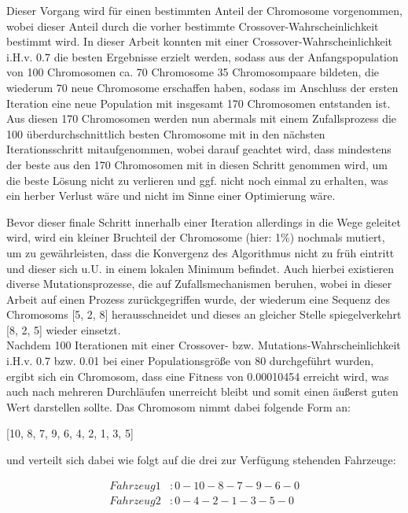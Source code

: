 \documentclass[a4paper,12pt,parskip,bibtotoc,liststotoc]{article}
\begin{document}
Dieser Vorgang wird für einen bestimmten Anteil der Chromosome vorgenommen, wobei dieser Anteil durch die vorher bestimmte Crossover-Wahrscheinlichkeit bestimmt wird. 
In dieser Arbeit konnten mit einer Crossover-Wahrscheinlichkeit i.H.v. 0.7 die besten Ergebnisse erzielt werden, sodass aus der Anfangspopulation von 100 Chromosomen ca. 70 Chromosome 35 Chromosompaare bildeten, die wiederum 70 neue Chromosome erschaffen haben, sodass im Anschluss der ersten Iteration eine neue Population mit insgesamt 170 Chromosomen entstanden ist. 
Aus diesen 170 Chromosomen werden nun abermals mit einem Zufallsprozess die 100 überdurchschnittlich besten Chromosome mit in den nächsten Iterationsschritt mitaufgenommen, wobei darauf geachtet wird, dass mindestens der beste aus den 170 Chromosomen mit in diesen Schritt genommen wird, um die beste Lösung nicht zu verlieren und ggf. nicht noch einmal zu erhalten, was ein herber Verlust wäre und nicht im Sinne einer Optimierung wäre.

Bevor dieser finale Schritt innerhalb einer Iteration allerdings in die Wege geleitet wird, wird ein kleiner Bruchteil der Chromosome (hier: 1\%) nochmals mutiert, um zu gewährleisten, dass die Konvergenz des Algorithmus nicht zu früh eintritt und dieser sich u.U. in einem lokalen Minimum befindet. 
Auch hierbei existieren diverse Mutationsprozesse, die auf Zufallsmechanismen beruhen, wobei in dieser Arbeit auf einen Prozess zurückgegriffen wurde, der wiederum eine Sequenz des Chromosoms [5, 2, 8] herausschneidet und dieses an gleicher Stelle spiegelverkehrt [8, 2, 5] wieder einsetzt.\\

Nachdem 100 Iterationen mit einer Crossover- bzw. Mutations-Wahrscheinlichkeit i.H.v. 0.7 bzw. 0.01 bei einer Populationsgröße von 80 durchgeführt wurden, ergibt sich ein Chromosom, dass eine Fitness von 0.00010454 erreicht wird, was auch nach mehreren Durchläufen unerreicht bleibt und somit einen äußerst guten Wert darstellen sollte.
Das Chromosom nimmt dabei folgende Form an: 

\begin{center}
[10, 8, 7, 9, 6, 4, 2, 1, 3, 5]
\end{center}

und verteilt sich dabei wie folgt auf die drei zur Verfügung stehenden Fahrzeuge: 


\begin{equation} \label{eq:test}
    \begin{aligned} 
         Fahrzeug 1&: 0 - 10 - 8 - 7 - 9 - 6 - 0 \\
        Fahrzeug 2&: 0 - 4 - 2 - 1 - 3 - 5 - 0\\
    \end{aligned}
\end{equation}
\end{document}

